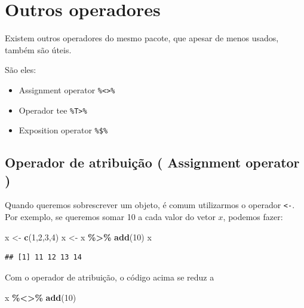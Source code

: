 \documentclass[
]{book}
\newenvironment{Shaded}{\begin{snugshade}}{\end{snugshade}}
\newcommand{\DecValTok}[1]{\textcolor[rgb]{0.00,0.00,0.81}{#1}}
\newcommand{\KeywordTok}[1]{\textcolor[rgb]{0.13,0.29,0.53}{\textbf{#1}}}
\newcommand{\NormalTok}[1]{#1}
\newcommand{\OperatorTok}[1]{\textcolor[rgb]{0.81,0.36,0.00}{\textbf{#1}}}
\newcommand{\StringTok}[1]{\textcolor[rgb]{0.31,0.60,0.02}{#1}}
\begin{document}
\hypertarget{outros-operadores}{%
\section{Outros operadores}\label{outros-operadores}}

Existem outros operadores do mesmo pacote, que apesar de menos usados, também são úteis.

São eles:

\begin{itemize}
\item
  Assignment operator \texttt{\%\textless{}\textgreater{}\%}
\item
  Operador tee \texttt{\%T\textgreater{}\%}
\item
  Exposition operator \texttt{\%\$\%}
\end{itemize}

\hypertarget{operador-de-atribuiuxe7uxe3o-assignment-operator}{%
\subsection{Operador de atribuição ( Assignment operator )}\label{operador-de-atribuiuxe7uxe3o-assignment-operator}}

Quando queremos sobrescrever um objeto, é comum utilizarmos o operador \texttt{\textless{}-}. Por exemplo, se queremos somar 10 a cada valor do vetor \(x\), podemos fazer:

\begin{Shaded}
\begin{Highlighting}[]
\NormalTok{x <{-}}\StringTok{ }\KeywordTok{c}\NormalTok{(}\DecValTok{1}\NormalTok{,}\DecValTok{2}\NormalTok{,}\DecValTok{3}\NormalTok{,}\DecValTok{4}\NormalTok{)}
\NormalTok{x <{-}}\StringTok{ }\NormalTok{x }\OperatorTok{\%>\%}\StringTok{  }\KeywordTok{add}\NormalTok{(}\DecValTok{10}\NormalTok{)}
\NormalTok{x}
\end{Highlighting}
\end{Shaded}

\begin{verbatim}
## [1] 11 12 13 14
\end{verbatim}

Com o operador de atribuição, o código acima se reduz a

\begin{Shaded}
\begin{Highlighting}[]
\NormalTok{x }\OperatorTok{\%<>\%}\StringTok{ }\KeywordTok{add}\NormalTok{(}\DecValTok{10}\NormalTok{)}
\end{Highlighting}
\end{Shaded}
\end{document}

